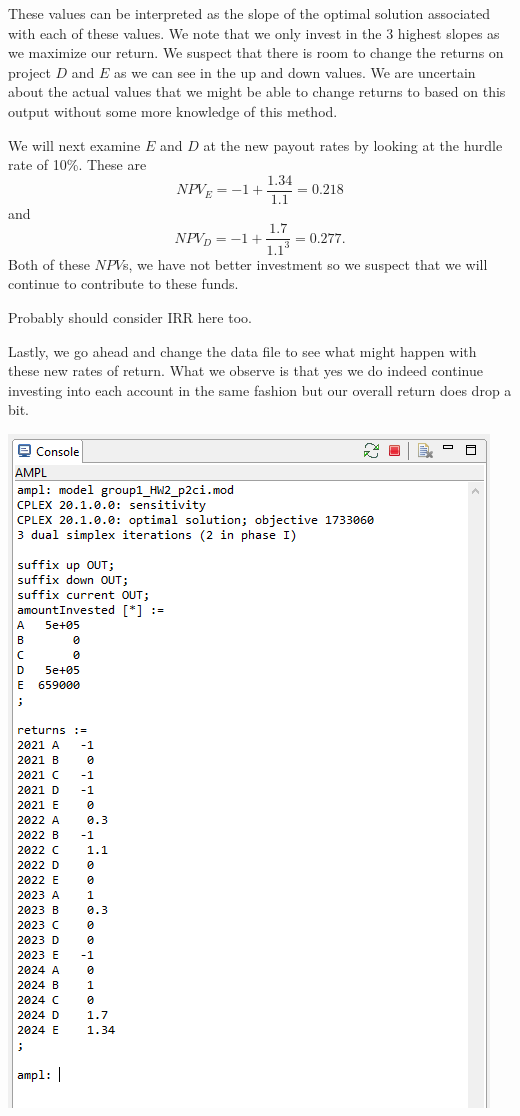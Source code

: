 \documentclass[11pt]{article}
\begin{document}
\begin{enumerate}
\begin{enumerate}
These values can be interpreted as the slope of the optimal solution associated with each of these values.  We note that we only invest in the 3 highest slopes as we maximize our return.  We suspect that there is room to change the returns on project $D$ and $E$ as we can see in the up and down values.  We are uncertain about the actual values that we might be able to change returns to based on this output without some more knowledge of this method.

We will next examine $E$ and $D$ at the new payout rates by looking at the hurdle rate of 10\%.  These are 
\[
NPV_E = -1+\frac{1.34}{1.1} = 0.218
\]
and
\[
NPV_D = -1+\frac{1.7}{1.1^3} = 0.277.
\]
Both of these $NPV$s, we have not better investment so we suspect that we will continue to contribute to these funds.

Probably should consider IRR here too.

Lastly, we go ahead and change the data file to see what might happen with these new rates of return.  What we observe is that yes we do indeed continue investing into each account in the same fashion but our overall return does drop a bit.

\includegraphics[width = .9\textwidth]{output2ci.png}




\end{enumerate}
\end{enumerate}
\end{document}
